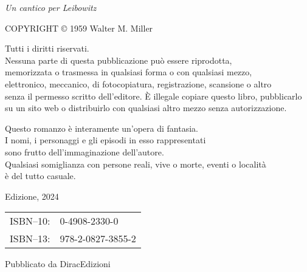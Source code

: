 \begin{flushleft}
	\begin{justify}
		{
		\footnotesize \textit{Un cantico per Leibowitz}
		
		\bigskip
		
		COPYRIGHT © 1959 Walter M. Miller
		
		\bigskip
		
		Tutti i diritti riservati.\\
		Nessuna parte di questa pubblicazione può essere riprodotta,\\
		memorizzata o trasmessa in qualsiasi forma o con qualsiasi mezzo,\\
		elettronico, meccanico, di fotocopiatura, registrazione, scansione o altro\\
		senza il permesso scritto dell'editore. È illegale copiare questo libro, pubblicarlo\\ 
		su un sito web o distribuirlo con qualsiasi altro mezzo senza autorizzazione.
		
		\bigskip
		
		Questo romanzo è interamente un'opera di fantasia.\\
		I nomi, i personaggi e gli episodi in esso rappresentati\\
	    sono frutto dell'immaginazione dell'autore.\\
	    Qualsiasi somiglianza con persone reali, vive o morte, eventi o località\\
	    è del tutto casuale.
		
		\bigskip
		
		\textonesuperior Edizione, 2024
		
		\bigskip
		
		\begin{tabular}{rl}
			ISBN--10:& 0-4908-2330-0\\ 
			ISBN--13:& 978-2-0827-3855-2\\ 
		\end{tabular}	
		
		\bigskip
		
		Pubblicato da DiracEdizioni 
		}
	\end{justify}
\end{flushleft}

\let\cleardoublepage\clearpage

\chapter*{\phantom{DEDICA}}


